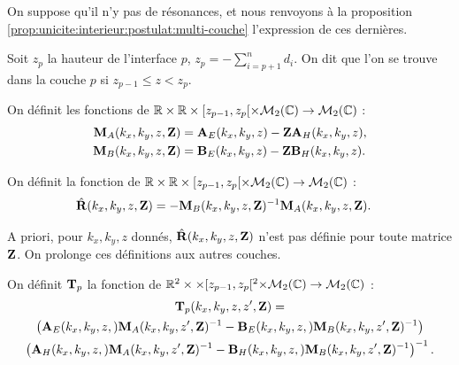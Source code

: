     On suppose qu'il n'y pas de résonances, et nous renvoyons à la proposition \ref{prop:unicite:interieur:postulat:multi-couche} l’expression de ces dernières.

    Soit \(z_p\) la hauteur de l'interface \(p\), \(z_p = -\sum_{i=p+1}^{n} d_{i}\). On dit que l'on se trouve dans la couche \(p\) si \(z_{p-1} \le z < z_p \).

    \begin{defn}
      \label{def:plan:matrices_MA-MB}
      On définit les fonctions de \(\mathbb R\times\mathbb R\times [z_{p-1}, z_p[ \times \mathcal{M}_{2}(\mathbb C) \rightarrow \mathcal{M}_{2}(\mathbb C)\) :
      \begin{align*}
        \mathbf{M}_{A}(k_x,k_y,z,\mathbf{Z}) &= \mathbf{A}_{E}(k_x,k_y,z)-\mathbf{Z}\mathbf{A}_{H}(k_x,k_y,z),
        \\
        \mathbf{M}_{B}(k_x,k_y,z,\mathbf{Z}) &= \mathbf{B}_{E}(k_x,k_y,z)-\mathbf{Z}\mathbf{B}_{H}(k_x,k_y,z).
      \end{align*}
    \end{defn}

    \begin{defn}
      \label{def:plan:reflexion:impedance}
      On définit la fonction de \(\mathbb R\times\mathbb R\times [z_{p-1}, z_p[ \times \mathcal{M}_{2}(\mathbb C) \rightarrow \mathcal{M}_{2}(\mathbb C)\) :
      \begin{align*}
        \hat{\mathbf{R}}(k_x,k_y,z,\mathbf{Z}) &= -\mathbf{M}_{B}(k_x,k_y,z,\mathbf{Z})^{-1}\mathbf{M}_{A}(k_x,k_y,z,\mathbf{Z}).
      \end{align*}
    \end{defn}
    A priori, pour \(k_x,k_y,z\) donnés, \(\hat{\mathbf{R}}(k_x,k_y,z,\mathbf{Z})\) n'est pas définie pour toute matrice \(\mathbf{Z}\).
    On prolonge ces définitions aux autres couches.

    \begin{defn}%
      \label{def:plan:transfert:impedance}

      On définit \(\mathbf{T}_p\) la fonction de \(\mathbb R^2\times\times [z_{p-1}, z_p[^2\times\mathcal{M}_2(\mathbb C)\rightarrow \mathcal{M}_{2}(\mathbb C)\) :
      \begin{multline*}
        \mathbf{T}_p(k_x,k_y,z,z',\mathbf{Z}) = \\
          \left(\mathbf{A}_{E}(k_x,k_y,z,)\mathbf{M}_{A}(k_x,k_y,z',\mathbf{Z})^{-1} - \mathbf{B}_{E}(k_x,k_y,z,)\mathbf{M}_{B}(k_x,k_y,z',\mathbf{Z})^{-1}\right) 
          \\
          \left(\mathbf{A}_{H}(k_x,k_y,z,)\mathbf{M}_{A}(k_x,k_y,z',\mathbf{Z})^{-1} - \mathbf{B}_{H}(k_x,k_y,z,)\mathbf{M}_{B}(k_x,k_y,z',\mathbf{Z})^{-1}\right)^{-1}.
      \end{multline*}
    \end{defn}

